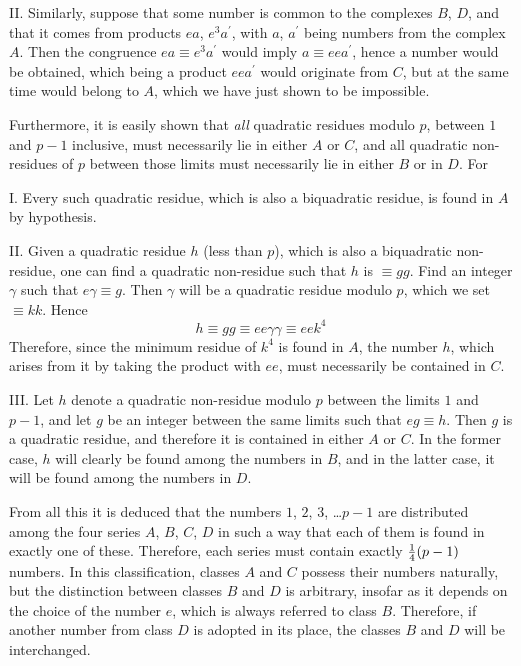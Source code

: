 \documentclass[twoside,12pt]{memoir}
\let\oldfrac\frac
\def\frac#1#2{\mathchoice{\tfrac{#1}{#2}}{\oldfrac{#1}{#2}}{\genfrac{}{}{}{2}{#1}{#2\mathstrut}}{\genfrac{}{}{}{3}{#1}{#2\mathstrut}}}
\begin{document}
II. Similarly, suppose that some number is common to the complexes \(B\), \(D\), and that it comes from products \(e a\), \(e^{3} a^{\prime}\), with \(a\), \(a^{\prime}\) being numbers from the complex \(A\).  Then the congruence \(e a \equiv e^{3} a^{\prime}\) would imply \(a \equiv e e a^{\prime}\), hence a number would be obtained, which being a product \(e e a^{\prime}\) would originate from \(C\), but at the same time would belong to \(A\), which we have just shown to be impossible.

Furthermore, it is easily shown that \textit{all} quadratic residues modulo \(p\), between \(1\) and \(p-1\) inclusive, must necessarily lie in either \(A\) or \(C\), and all quadratic non-residues of \(p\) between those limits must necessarily lie in either \(B\) or in \(D\). For
 
I. Every such quadratic residue, which is also a biquadratic residue, is found in \(A\) by hypothesis.
 
II. Given a quadratic residue \(h\) (less than \(p\)), which is also a biquadratic non-residue, one can find a quadratic non-residue such that \(h\) is \(\equiv g g\). Find an integer \(\gamma\) such that \(e \gamma \equiv g\).  Then \(\gamma\) will be a quadratic residue modulo \(p\), which we set \(\equiv k k\). Hence
\[h \equiv g g \equiv e e \gamma \gamma \equiv e e k^{4}\]
Therefore, since the minimum residue of \(k^{4}\) is found in \(A\), the number \(h\), which arises from it by taking the product with \(e e\), must necessarily be contained in \(C\).
 
III. Let \(h\) denote a quadratic non-residue modulo \(p\) between the limits \(1\) and \(p-1\), and let \(g\) be an integer between the same limits such that \(e g \equiv h\). Then \(g\) is a quadratic residue, and therefore it is contained in either \(A\) or \(C\). In the former case, \(h\) will clearly be found among the numbers in \(B\), and in the latter case, it will be found among the numbers in \(D\).

From all this it is deduced that the numbers \(1\), \(2\), \(3\), \dots \(p-1\) are distributed among the four series \(A\), \(B\), \(C\), \(D\) in such a way that each of them is found in exactly one of these.  Therefore, each series must contain exactly \(\frac{1}{4}(p-1)\) numbers.  In this classification, classes \(A\) and \(C\) possess their numbers naturally, but the distinction between classes \(B\) and \(D\) is arbitrary, insofar as it depends on the choice of the number \(e\), which is always referred to class \(B\).  Therefore, if another number from class \(D\) is adopted in its place, the classes \(B\) and \(D\) will be interchanged.
\end{document}
